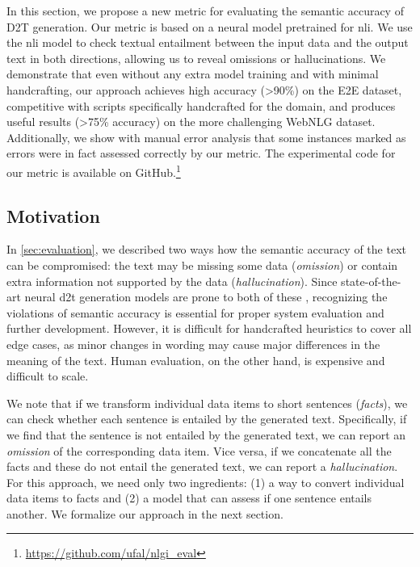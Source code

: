 In this section, we propose a new metric for evaluating the semantic accuracy of D2T generation. Our metric is based on a neural model pretrained for \ac{nli}.
We use the \ac{nli} model to check textual entailment between the input data and the output text in both directions, allowing us to reveal omissions or hallucinations.
We demonstrate that even without any extra model training and with minimal handcrafting, our approach achieves high accuracy (>90\%) on the E2E dataset, competitive with scripts specifically handcrafted for the domain, and produces useful results (>75\% accuracy) on the more challenging WebNLG dataset. Additionally, we show with manual error analysis that some instances marked as errors were in fact assessed correctly by our metric. The experimental code for our metric is available on GitHub.\footnote{\url{https://github.com/ufal/nlgi_eval}}

\subsection{Motivation}
In \autoref{sec:evaluation}, we described two ways how the semantic accuracy of the text can be compromised: the text may be missing some data (\emph{omission}) or contain extra information not supported by the data (\emph{hallucination}). Since state-of-the-art neural \ac{d2t} generation models are prone to both of these \cite{gehrmannEndtoEndContentPlan2018,ferreiraNeuralDatatotextGeneration2019,dusekEvaluatingStateoftheartEndtoEnd2020}, recognizing the violations of semantic accuracy is essential for proper system evaluation and further development. However, it is difficult for handcrafted heuristics to cover all edge cases, as minor changes in wording may cause major differences in the meaning of the text. Human evaluation, on the other hand, is expensive and difficult to scale.

We note that if we transform individual data items to short sentences (\emph{facts}), we can check whether each sentence is entailed by the generated text. Specifically, if we find that the sentence is not entailed by the generated text, we can report an \emph{omission} of the corresponding data item. Vice versa, if we concatenate all the facts and these do not entail the generated text, we can report a \emph{hallucination}. For this approach, we need only two ingredients: (1) a way to convert individual data items to facts and (2) a model that can assess if one sentence entails another. We formalize our approach in the next section.



